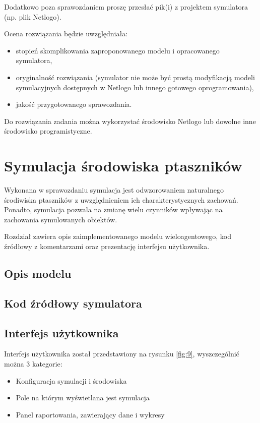 \documentclass[a4paper,11pt,titlepage]{article}
\begin{document}
Dodatkowo poza sprawozdaniem proszę przesłać pik(i) z projektem symulatora (np. plik Netlogo).

Ocena rozwiązania będzie uwzględniała:
\begin{itemize}
\item stopień skomplikowania zaproponowanego modelu i opracowanego symulatora,
\item oryginalność rozwiązania (symulator nie może być prostą modyfikacją modeli symulacyjnych dostępnych w Netlogo lub innego gotowego oprogramowania),
\item jakość przygotowanego sprawozdania.
\end{itemize}

Do rozwiązania zadania można wykorzystać środowisko Netlogo lub dowolne inne środowisko programistyczne.

\section{Symulacja środowiska ptaszników}
Wykonana w sprawozdaniu symulacja jest odwzorowaniem naturalnego środiwiska ptaszników z uwzględnieniem ich charakterystycznych zachowań. Ponadto, symulacja pozwala na zmianę wielu czynników wpływając na zachowania symulowanych obiektów.

Rozdział zawiera opis zaimplementowanego modelu wieloagentowego, kod źródłowy z komentarzami oraz prezentację interfejsu użytkownika.

\subsection{Opis modelu}

\subsection{Kod źródłowy symulatora}

\subsection{Interfejs użytkownika}
Interfejs użytkownika został przedstawiony na rysunku \ref{fig:9}, wyszczególnić można 3 kategorie:
\begin{itemize}
	\item Konfiguracja symulacji i środowiska
	\item Pole na którym wyświetlana jest symulacja
	\item Panel raportowania, zawierający dane i wykresy
\end{itemize}
\end{document}
